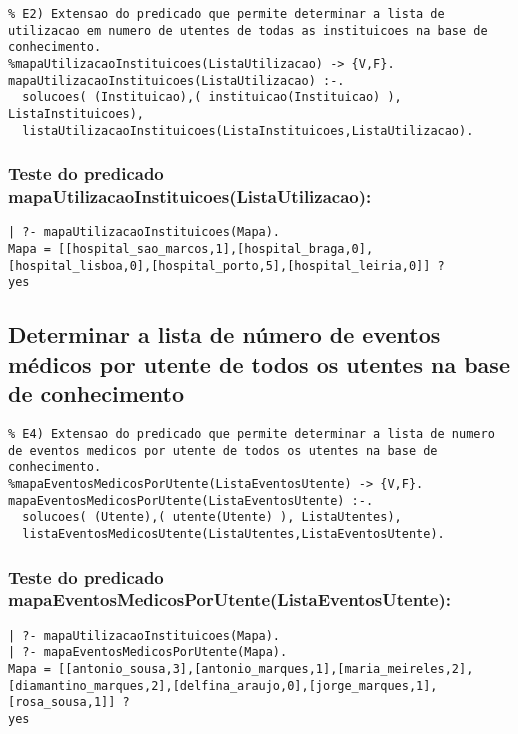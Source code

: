 \documentclass[
  oneside,
  10pt, a4paper,
  footinclude=true,
  headinclude=true,
  cleardoublepage=empty
]{scrbook}
\begin{document}
\begin{lstlisting}
% E2) Extensao do predicado que permite determinar a lista de utilizacao em numero de utentes de todas as instituicoes na base de conhecimento.
%mapaUtilizacaoInstituicoes(ListaUtilizacao) -> {V,F}.
mapaUtilizacaoInstituicoes(ListaUtilizacao) :-.
  solucoes( (Instituicao),( instituicao(Instituicao) ), ListaInstituicoes),
  listaUtilizacaoInstituicoes(ListaInstituicoes,ListaUtilizacao).
\end{lstlisting}

\subsubsection{Teste do predicado \textbf{mapaUtilizacaoInstituicoes(ListaUtilizacao)}:}

\begin{lstlisting}
| ?- mapaUtilizacaoInstituicoes(Mapa).
Mapa = [[hospital_sao_marcos,1],[hospital_braga,0],[hospital_lisboa,0],[hospital_porto,5],[hospital_leiria,0]] ? 
yes
\end{lstlisting}









\subsection{Determinar  a lista de número de eventos médicos por utente de todos os utentes na base de conhecimento}

\begin{lstlisting}
% E4) Extensao do predicado que permite determinar a lista de numero de eventos medicos por utente de todos os utentes na base de conhecimento.
%mapaEventosMedicosPorUtente(ListaEventosUtente) -> {V,F}.
mapaEventosMedicosPorUtente(ListaEventosUtente) :-.
  solucoes( (Utente),( utente(Utente) ), ListaUtentes),
  listaEventosMedicosUtente(ListaUtentes,ListaEventosUtente).
\end{lstlisting}

\subsubsection{Teste do predicado \textbf{mapaEventosMedicosPorUtente(ListaEventosUtente)}:}

\begin{lstlisting}
| ?- mapaUtilizacaoInstituicoes(Mapa).
| ?- mapaEventosMedicosPorUtente(Mapa).
Mapa = [[antonio_sousa,3],[antonio_marques,1],[maria_meireles,2],[diamantino_marques,2],[delfina_araujo,0],[jorge_marques,1],[rosa_sousa,1]] ? 
yes
\end{lstlisting}
\end{document}
